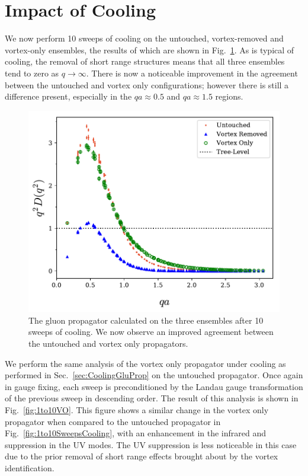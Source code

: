 \section{Impact of Cooling}
We now perform 10 sweeps of cooling on the untouched, vortex-removed and vortex-only ensembles, the results of which are shown in Fig.~\ref{fig:10SweepsCooling}. As is typical of cooling, the removal of short range structures means that all three ensembles tend to zero as $q\rightarrow\infty$. There is now a noticeable improvement in the agreement between the untouched and vortex only configurations; however there is still a difference present, especially in the $qa\approx0.5$ and $qa\approx1.5$ regions.\\
%
\begin{figure}[htb!]
\centering
\includegraphics[width=\linewidth]{./ScalarGluComp_q2_10sweepsAll.pdf}
\caption[The gluon propagator calculated on the three ensembles after 10 sweeps of cooling.]{\label{fig:10SweepsCooling}The gluon propagator calculated on the three ensembles after 10 sweeps of cooling. We now observe an improved agreement between the untouched and vortex only propagators.}
\end{figure}  
%

We perform the same analysis of the vortex only propagator under cooling as performed in Sec.~\ref{sec:CoolingGluProp} on the untouched propagator. Once again in gauge fixing, each sweep is preconditioned by the Landau gauge transformation of the previous sweep in descending order. The result of this analysis is shown in Fig.~\ref{fig:1to10VO}. This figure shows a similar change in the vortex only propagator when compared to the untouched propagator in Fig.~\ref{fig:1to10SweepsCooling}, with an enhancement in the infrared and suppression in the UV modes. The UV suppression is less noticeable in this case due to the prior removal of short range effects brought about by the vortex identification.\\

